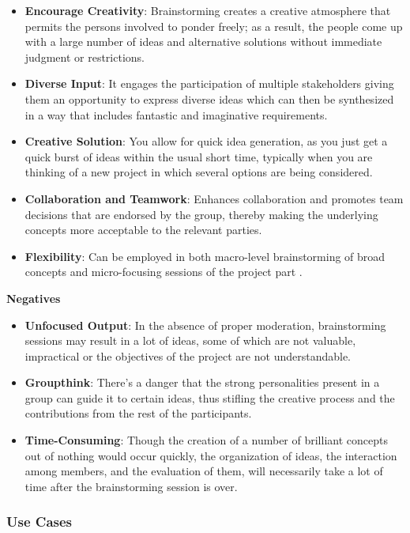 \documentclass[conference]{IEEEtran}
\begin{document}
\begin{itemize}
    \item \textbf{Encourage Creativity}: Brainstorming creates a creative atmosphere that permits the persons involved to ponder freely; as a result, the people come up with a large number of ideas and alternative solutions without immediate judgment or restrictions.
    \item \textbf{Diverse Input}: It engages the participation of multiple stakeholders giving them an opportunity to express diverse ideas which can then be synthesized in a way that includes fantastic and imaginative requirements.
    \item \textbf{Creative Solution}: You allow for quick idea generation, as you just get a quick burst of ideas within the usual short time, typically when you are thinking of a new project in which several options are being considered.
    \item \textbf{Collaboration and Teamwork}: Enhances collaboration and promotes team decisions that are endorsed by the group, thereby making the underlying concepts more acceptable to the relevant parties.
    \item \textbf{Flexibility}: Can be employed in both macro-level brainstorming of broad concepts and micro-focusing sessions of the project part \cite{cite9}.
\end{itemize}

\textbf{Negatives}

\begin{itemize}
    \item \textbf{Unfocused Output}: In the absence of proper moderation, brainstorming sessions may result in a lot of ideas, some of which are not valuable, impractical or the objectives of the project are not understandable.
    \item \textbf{Groupthink}: There's a danger that the strong personalities present in a group can guide it to certain ideas, thus stifling the creative process and the contributions from the rest of the participants.
    \item \textbf{Time-Consuming}: Though the creation of a number of brilliant concepts out of nothing would occur quickly, the organization of ideas, the interaction among members, and the evaluation of them, will necessarily take a lot of time after the brainstorming session is over.
\end{itemize}

\subsubsection{Use Cases}
\end{document}
